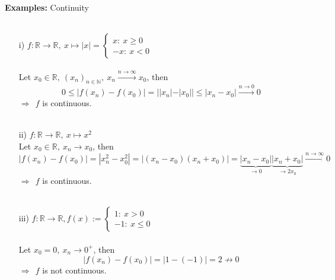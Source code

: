\begin{frame}
\textbf{Examples:} Continuity\\~\\
\begin{itemize}
	\item [i)]
	$f:\mathbb{R}\rightarrow\mathbb{R},~x\mapsto |x|=\begin{cases}
	x:~x\geq 0\\
	-x:~x<0
	\end{cases}$\\~\\
	{\color{cyan}
	Let $x_0\in\mathbb{R},~(x_n)_{n\in\mathbb{N}},~x_n\xrightarrow{n\to\infty}x_0$, then
	$$
	0\leq |f(x_n)-f(x_0)|=||x_n|-|x_0||\leq|x_n-x_0|\xrightarrow{n\to 0} 0
	$$
	$\Rightarrow~~f$ is continuous.
	}
~\\~\\
	\item [ii)]
	$f:\mathbb{R}\rightarrow\mathbb{R},~x\mapsto x^2$\\
	{\color{cyan}
	Let $x_0\in\mathbb{R},~x_n\rightarrow x_0$, then
	$$
	|f(x_n)-f(x_0)|=|x_n^2-x_0^2|=|(x_n-x_0)(x_n+x_0)|=\underbrace{|x_n-x_0|}_{\to 0}\underbrace{|x_n+x_0|}_{\to 2x_0}\xrightarrow{n\to\infty} 0
	$$
	$\Rightarrow~~f$ is continuous.
	}
~\\~\\
	\item [iii)]
	$f:\mathbb{R}\rightarrow\mathbb{R},f(x):=\begin{cases}
	1:~x>0\\
	-1:~x\leq0
	\end{cases}$\\~\\
	{\color{cyan}
	Let $x_0=0,~x_n\rightarrow 0^+$, then
	$$
	|f(x_n)-f(x_0)|=|1-(-1)|=2\nrightarrow 0
	$$
	$\Rightarrow~~f$ is not continuous.
	}
\end{itemize}

\end{frame}

